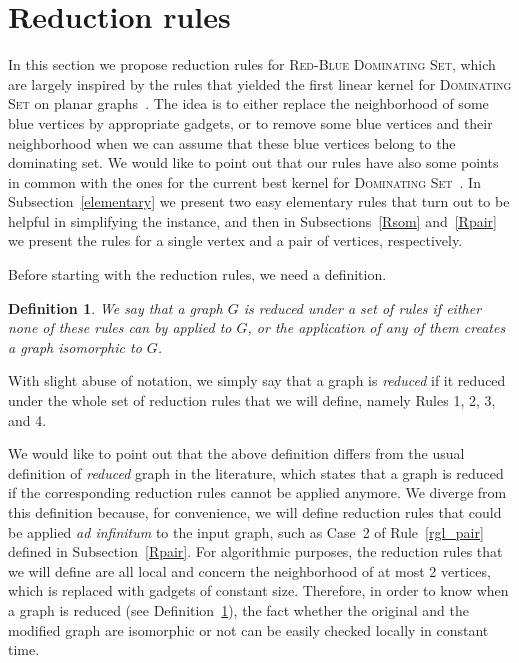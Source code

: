 \documentclass[a4paper,11pt]{article}
\newtheorem{defi} {Definition}
\newcommand{\domrb}  [0] {\textsc{Red-Blue Dominating Set}\xspace}
\newcommand{\dom}    [0] {\textsc{Dominating Set}\xspace}
\begin{document}
\section{Reduction rules} \label{sec:RedRules}


In this section we propose reduction rules for \domrb, which are largely inspired by the rules that yielded the first linear kernel for \dom on planar graphs~\cite{AFN04}. The idea is to either replace the neighborhood of some blue vertices by appropriate gadgets, or to remove some blue vertices and their neighborhood when we can assume that these blue vertices belong to the dominating set. We would like to point out that our rules have also some points in common with the ones for the current best kernel for \dom~\cite{CFKX07}. In Subsection~\ref{elementary} we present two easy elementary rules that turn out to be helpful in simplifying the instance, and then in Subsections~\ref{Rsom} and~\ref{Rpair} we present the rules for a single vertex and a pair of vertices, respectively.





Before starting with the reduction rules, we need a definition.

\begin{defi}\label{def:reduce}
We say that a graph $G$ is \emph{reduced under a set of rules} if either none of these rules can by applied to $G$, or the application of any of them creates a graph isomorphic to $G$.
\end{defi}

With slight abuse of notation, we simply say that a graph is \emph{reduced} if it reduced under the whole set of reduction rules that we will define, namely Rules 1, 2, 3, and 4.

We would like to point out that the above definition differs from the usual definition of \emph{reduced} graph in the literature, which states that a graph is reduced if the corresponding reduction rules cannot be applied anymore. We diverge from this definition because, for convenience, we will define reduction rules  that could be applied {\sl ad infinitum} to the input graph, such as Case~2 of Rule~\ref{rgl_pair} defined in Subsection~\ref{Rpair}. For algorithmic purposes, the reduction rules that we will define are all local and concern the neighborhood of at most 2 vertices, which is replaced with gadgets of constant size. Therefore, in order to know when a graph is reduced (see Definition~\ref{def:reduce}), the fact whether the original and the modified graph are isomorphic or not  can be easily checked locally in constant time.
\end{document}
